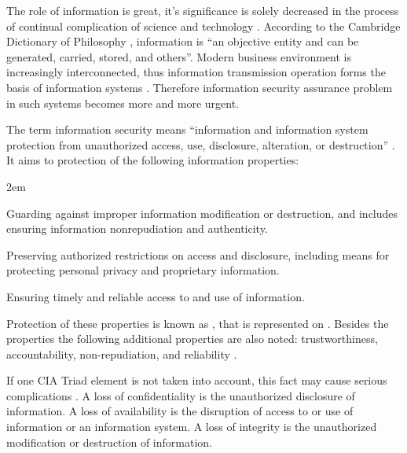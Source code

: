 %
The role of information is great, it's significance is solely decreased in the process of continual complication of science and technology . 
%
According to the Cambridge Dictionary of Philosophy , information is ``an objective entity and can be generated, carried, stored, and others''. 
%
Modern business environment is increasingly interconnected, thus information transmission operation forms the basis of information systems . 
%
Therefore information security assurance problem in such systems becomes more and more urgent. 

%
The term information security means ``information and information system protection from unauthorized access, use, disclosure, alteration, or destruction'' . 
%
It aims to protection of the following information properties:
\begin{description}
	\leftskip2em%
	\setlength{\itemsep}{0pt}%
	\setlength{\parsep}{0pt}%

	\item[Integrity] Guarding against improper information modification or destruction, and includes ensuring information nonrepudiation and authenticity. 
	\item[Confidentiality] Preserving authorized restrictions on access and disclosure, including means for protecting personal privacy and proprietary information. 
	\item[Availability] Ensuring timely and reliable access to and use of information. 
\end{description}

%
Protection of these properties is known as , that is represented on . 
%
Besides the properties the following additional properties are also noted: trustworthiness, accountability, non-repudiation, and reliability . 


%
If one CIA Triad element is not taken into account, this fact may cause serious complications . 
%
A loss of confidentiality is the unauthorized disclosure of information. 
%
A loss of availability is the disruption of access to or use of information or an information system. 
%
A loss of integrity is the unauthorized modification or destruction of information. 


